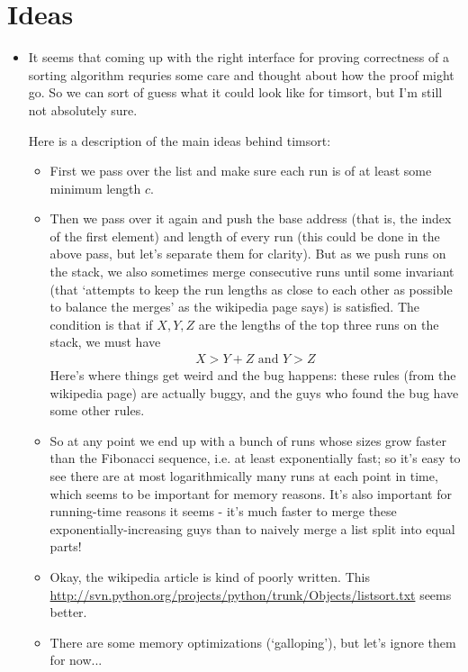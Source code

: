 \section{Ideas}
\label{sec:}


\begin{itemize}
\item It seems that coming up with the right interface for proving correctness of a sorting algorithm requries some care and thought about how the proof might go. So we can sort of guess what it could look like for timsort, but I'm still not absolutely sure.

Here is a description of the main ideas behind timsort: 
\begin{itemize}
	\item First we pass over the list and make sure each run is of at least some minimum length $c$.
	\item Then we pass over it again and push the base address (that is, the index of the first element) and length of every run (this could be done in the above pass, but let's separate them for clarity). But as we push runs on the stack, we also sometimes merge consecutive runs until some invariant (that `attempts to keep the run lengths as close to each other as possible to balance the merges' as the wikipedia page says) is satisfied. The condition is that if $X,Y,Z$ are the lengths of the top three runs on the stack, we must have
	\begin{align*}
	X > Y + Z \text{ and } Y >Z
\end{align*}
	Here's where things get weird and the bug happens: these rules (from the wikipedia page) are actually buggy, and the guys who found the bug have some other rules. 
	\item So at any point we end up with a bunch of runs whose sizes grow faster than the Fibonacci sequence, i.e. at least exponentially fast; so it's easy to see there are at most logarithmically many runs at each point in time, which seems to be important for memory reasons. It's also important for running-time reasons it seems - it's much faster to merge these exponentially-increasing guys than to naively merge a list split into equal parts!
	\item Okay, the wikipedia article is kind of poorly written. This \url{http://svn.python.org/projects/python/trunk/Objects/listsort.txt} seems better. 
	\item There are some memory optimizations (`galloping'), but let's ignore them for now...
\end{itemize}





\end{itemize}
